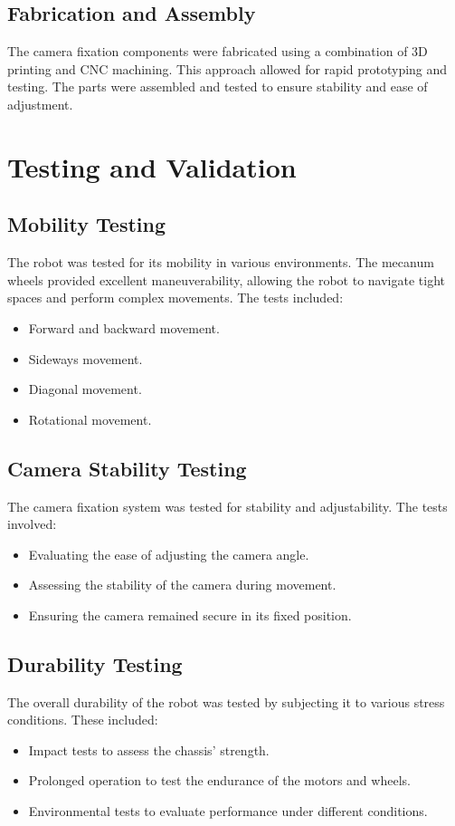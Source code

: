 \newpage
\subsection{Fabrication and Assembly}
The camera fixation components were fabricated using a combination of 3D printing and CNC
machining. This approach allowed for rapid prototyping and testing. The parts were assembled and
tested to ensure stability and ease of adjustment.
\section{Testing and Validation}
\subsection{Mobility Testing}
The robot was tested for its mobility in various environments. The mecanum wheels provided
excellent maneuverability, allowing the robot to navigate tight spaces and perform complex
movements. The tests included:
\begin{itemize}
	\item Forward and backward movement.
	\item Sideways movement.
	\item Diagonal movement.
	\item Rotational movement.
\end{itemize}


\subsection{Camera Stability Testing}
The camera fixation system was tested for stability and adjustability. The tests involved:
\begin{itemize}
	\item Evaluating the ease of adjusting the camera angle.
	\item Assessing the stability of the camera during movement.
	\item Ensuring the camera remained secure in its fixed position.
\end{itemize}


\subsection{Durability Testing}
The overall durability of the robot was tested by subjecting it to various stress conditions. These
included:
\begin{itemize}
	\item Impact tests to assess the chassis’ strength.
	\item Prolonged operation to test the endurance of the motors and wheels.
	\item Environmental tests to evaluate performance under different conditions.
\end{itemize}

